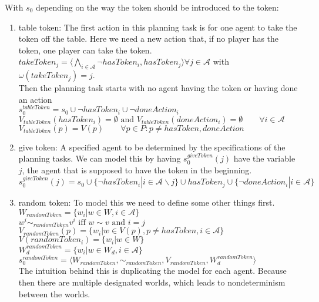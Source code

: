 With $s_0$ depending on the way the token should be introduced to the token:
\begin{enumerate}
  \item table token: The first action in this planning task is for one agent to take the token off the table. Here we need a new action that, if no player has the token, one player can take the token.\\
    $takeToken_j=\langle \bigwedge\limits_{i \in \mathcal{A}}
    \neg hasToken_i, hasToken_j \rangle \forall j \in \mathcal{A}$ with $\omega(takeToken_j)=j$. \\
    Then the planning task starts with no agent having the token or having done an action \\
    $s_0^{tableToken} = s_0 \cup \neg hasToken_i \cup \neg doneAction_i$ \\
    $V_{tableToken}(hasToken_i)=\emptyset \text{ and } V_{tableToken}(doneAction_i)=\emptyset \qquad \forall i\in \mathcal{A}$\\
    $V_{tableToken}(p)=V(p) \qquad \forall p\in P : p \not = hasToken, doneAction$

  \item give token:
    A specified agent to be determined by the specifications of the planning tasks. We can model this by having $s_0^{giveToken}(j)$ have the variable $j$, the agent that is supposed to have the token in the beginning. \\
     $s_0^{giveToken}(j) = s_0 \cup \{\neg hasToken_i|i \in \mathcal{A} \backslash j\} \cup hasToken_j \cup \{\neg doneAction_i|i \in \mathcal{A}\}$

  \item random token:
    To model this we need to define some other things first.
    $W_{randomToken}=\{w_i|w \in W, i\in \mathcal{A}\}$ \\
    $w^i \sim_{randomToken} v^i \text{ iff } w \sim v \text{ and } i=j$ \\
    $V_{randomToken}(p)=\{w_i|w\in V(p), p \not = hasToken, i\in \mathcal{A}\}$ \\
    $V(randomToken_i)=\{w_i|w \in W\}$ \\
    $W^{randomToken}_d=\{w_i|w\in W_d, i\in \mathcal{A}\}$ \\
    $s_0^{randomToken}=\langle W_{randomToken}, \sim_{randomToken}, V_{randomToken}, W^{randomToken}_d \rangle$ \\
    The intuition behind this is duplicating the model for each agent. Because then there are multiple designated worlds, which leads to nondeterminism between the worlds.
\end{enumerate}



